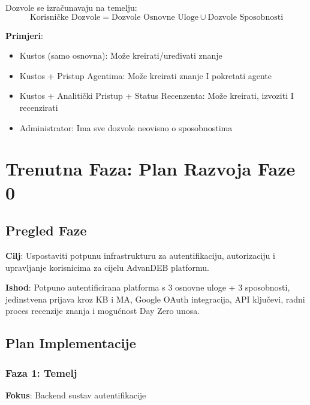 \documentclass[12pt,a4paper]{article}
\begin{document}
Dozvole se izračunavaju na temelju:
\begin{equation}
\text{Korisničke Dozvole} = \text{Dozvole Osnovne Uloge} \cup \text{Dozvole Sposobnosti}
\end{equation}

\textbf{Primjeri}:
\begin{itemize}
    \item Kustos (samo osnovna): Može kreirati/uređivati znanje
    \item Kustos + Pristup Agentima: Može kreirati znanje I pokretati agente
    \item Kustos + Analitički Pristup + Status Recenzenta: Može kreirati, izvoziti I recenzirati
    \item Administrator: Ima sve dozvole neovisno o sposobnostima
\end{itemize}

\section{Trenutna Faza: Plan Razvoja Faze 0}

\subsection{Pregled Faze}

\textbf{Cilj}: Uspostaviti potpunu infrastrukturu za autentifikaciju, autorizaciju i upravljanje korisnicima za cijelu AdvanDEB platformu.

\textbf{Ishod}: Potpuno autentificirana platforma s 3 osnovne uloge + 3 sposobnosti, jedinstvena prijava kroz KB i MA, Google OAuth integracija, API ključevi, radni proces recenzije znanja i mogućnost Day Zero unosa.

\subsection{Plan Implementacije}

\subsubsection{Faza 1: Temelj}
\textbf{Fokus}: Backend sustav autentifikacije
\end{document}
